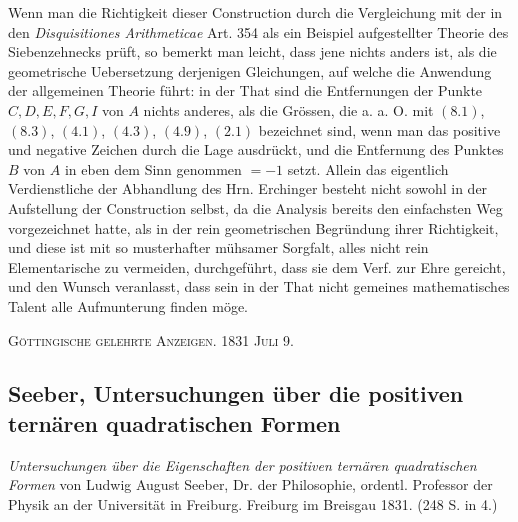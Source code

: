 \documentclass[12pt]{article}
\begin{document}
Wenn man die Richtigkeit dieser Construction durch die Vergleichung mit der in den \textit{Disquisitiones Arithmeticae} Art. 354 als ein Beispiel aufgestellter Theorie des Siebenzehnecks prüft, so bemerkt man leicht, dass jene nichts anders ist, als die geometrische Uebersetzung derjenigen Gleichungen, auf welche die Anwendung der allgemeinen Theorie führt: in der That sind die Entfernungen der Punkte $C,D,E,F,G,I$ von $A$ nichts anderes, als die Grössen, die a. a. O. mit $(8.1)$, $(8.3)$, $(4.1)$, $(4.3)$, $(4.9)$, $(2.1)$ bezeichnet sind, wenn man das positive und negative Zeichen durch die Lage ausdrückt, und die Entfernung des Punktes $B$ von $A$ in eben dem Sinn genommen $=-1$ setzt. Allein das eigentlich Verdienstliche der Abhandlung des Hrn. Erchinger besteht nicht sowohl in der Aufstellung der Construction selbst, da die Analysis bereits den einfachsten Weg vorgezeichnet hatte, als in der rein geometrischen Begründung ihrer Richtigkeit, und diese ist mit so musterhafter mühsamer Sorgfalt, alles nicht rein Elementarische zu vermeiden, durchgeführt, dass sie dem Verf. zur Ehre gereicht, und den Wunsch veranlasst, dass sein in der That nicht gemeines mathematisches Talent alle Aufmunterung finden möge.

\begin{center}
\textsc{Göttingische gelehrte Anzeigen. 1831 Juli 9.}
\end{center}

\subsection*{Seeber, Untersuchungen über die positiven ternären quadratischen Formen}

\begin{center}
\textit{Untersuchungen über die Eigenschaften der positiven ternären quadratischen Formen} von Ludwig August Seeber, Dr. der Philosophie, ordentl. Professor der Physik an der Universität in Freiburg. Freiburg im Breisgau 1831. (248 S. in 4.)
\end{center}
\end{document}
